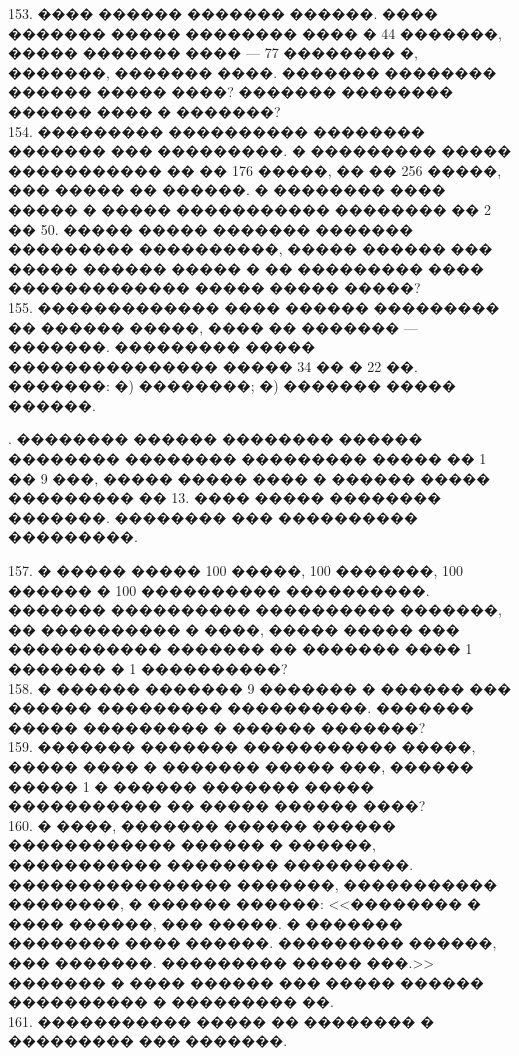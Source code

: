 \documentclass[12pt]{article}
\begin{document}
153. ���� ������ ������� ������. ���� ������� ����� �������� ���� � 44 �������, ����� ������� ���� --- 77 �������� �, �������, ������� ����. ������� �������� ������ ����� ����? ������� �������� ������ ���� � �������?\\
154. ��������� ���������� �������� ������� ��� ���������. � ��������� ����� ����������� �� �� 176 �����, �� �� 256 �����, ��� ����� �� ������. � �������� ���� ����� � ����� ����������� �������� �� 2 �� 50. ����� ����� ������� ������� ��������� ����������, ����� ������ ��� ����� ������ ����� � �� ��������� ���� ������������� ����� ����� �����?\\
155. ������������� ���� ������ ��������� �� ������ �����, ���� �� ������� --- �������. ��������� ����� ��������������� ����� 34 �� � 22 ��. �������: �) ��������; �) ������� ����� ������.
\begin{center}
\begin{figure}[ht!]
\end{figure}
\end{center}\newpage{}. �������� ������ �������� ������ �������� �������� ��������� ����� �� 1 �� 9 ���, ����� ����� ���� � ������ ����� ��������� �� 13. ���� ����� �������� �������. �������� ��� ���������� ���������.
\begin{center}
\begin{figure}[ht!]
\end{figure}
\end{center}
157. � ����� ����� 100 �����, 100 �������, 100 ������ � 100 ���������� ����������. ������� ���������� ���������� �������, �� ���������� � ����, ����� ����� ��� ����������� ������� �� ������� ���� 1 ������� � 1 ����������?\\
158. � ������ ������� 9 ������� � ������ ��� ������ ��������� ����������. ������� ����� ��������� � ������ �������?\\
159. ������� ������� ����������� �����, ����� ���� � ������� ����� ���, ������ ����� 1 � ������ ������� ����� ����������� �� ����� ������ ����?\\
160. � ����, ������� ������ ������ ������������ ������ � ������, ����������� �������� ���������. ���������������� �������, ����������� ��������, � ������ ������: <<�������� � ���� ������, ��� �����. � ������� �������� ���� ������. ��������� ������, ��� �������. ��������� ����� ���.>> ������� � ���� ������
��� ����� ������ ���������� � ��������� ��.\\
161. ����������� ����� �� �������� � ��������� ��� �������.
\end{document}

